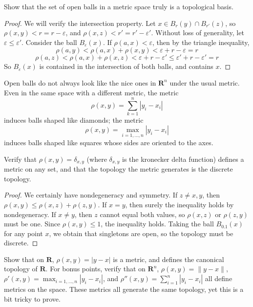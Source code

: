 \begin{exercise}
    Show that the set of open balls in a metric space truly is a topological basis.
\end{exercise}
\begin{proof}
    We will verify the intersection property. Let $x \in B_r(y) \cap B_{r'}(z)$, so $\rho(x,y) < r = r - \varepsilon$, and $\rho(x,z) < r' = r' - \varepsilon'$. Without loss of generality, let $\varepsilon \leq \varepsilon'$. Consider the ball $B_\varepsilon(x)$. If $\rho(a,x) < \varepsilon$, then by the triangle inequality,
    \[ \rho(a,y) < \rho(a,x) + \rho(x,y) < \varepsilon + r - \varepsilon = r \]
    \[ \rho(a,z) < \rho(a,x) + \rho(x,z) < \varepsilon + r - \varepsilon' \leq \varepsilon' + r - \varepsilon' = r \]
    So $B_\varepsilon(x)$ is contained in the intersection of both balls, and contains $x$.
\end{proof}

Open balls do not always look like the nice ones in $\mathbf{R}^n$ under the usual metric. Even in the same space with a different metric, the metric
%
\[ \rho(x,y) = \sum_{k = 1}^n |y_i - x_i| \]
%
induces balls shaped like diamonds; the metric
%
\[ \rho(x,y) = \max_{i = 1,\dots,n} |y_i - x_i| \]
%
induces balls shaped like squares whose sides are oriented to the axes.

\begin{exercise}
    Verify that $\rho(x,y) = \delta_{x,y}$ (where $\delta_{x,y}$ is the kronecker delta function) defines a metric on any set, and that the topology the metric generates is the discrete topology.
\end{exercise}
\begin{proof}
    We certainly have nondegeneracy and symmetry. If $z \neq x,y$, then $\rho(x,y) \leq \rho(x,z) + \rho(z,y)$. If $x = y$, then surely the inequality holds by nondegeneracy. If $x \neq y$, then $z$ cannot equal both values, so $\rho(x,z)$ or $\rho(z,y)$ must be one. Since $\rho(x,y) \leq 1$, the inequality holds. Taking the ball $B_{0.1}(x)$ for any point $x$, we obtain that singletons are open, so the topology must be discrete.
\end{proof}

\begin{exercise}
    Show that on $\mathbf{R}$, $\rho(x,y) = |y - x|$ is a metric, and defines the canonical topology of $\mathbf{R}$. For bonus points, verify that on $\mathbf{R}^n$, $\rho(x,y) = \|y - x\|$, $\rho'(x,y) = \max_{i = 1,\dots,n} |y_i - x_i|$, and $\rho''(x,y) = \sum_{i = 1}^n |y_i - x_i|$ all define metrics on the space. These metrics all generate the same topology, yet this is a bit tricky to prove.
\end{exercise}

